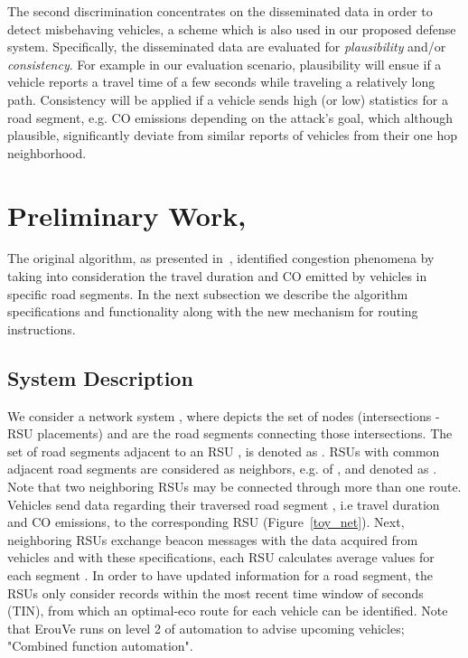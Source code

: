 \documentclass[conference]{IEEEtran}
\begin{document}
The second discrimination concentrates on the disseminated data in order to detect misbehaving vehicles, a scheme which is also used in our proposed defense system. Specifically,
the disseminated data are evaluated for {\it plausibility} and/or {\it consistency}. For example in our evaluation scenario, plausibility will ensue if a vehicle reports
a travel time of a few seconds while traveling a relatively long path. Consistency will be applied if a vehicle sends high (or low) statistics for a road segment, e.g. CO
emissions depending on the attack's goal, which although plausible, significantly deviate from similar reports of
vehicles from their one hop neighborhood.




\section{Preliminary Work, }
\label{erouve-pre}

The original  algorithm, as presented in~\cite{maglaras2013exploiting}, identified congestion phenomena by taking into consideration 
the travel duration and CO emitted by vehicles in specific road segments. In the next subsection we describe the algorithm
specifications and functionality along with the new mechanism for routing instructions.


\subsection{System Description}
We consider a network system , where  depicts the set of nodes (intersections - RSU placements) and  are the road segments connecting those intersections. The set of road segments adjacent to an RSU , is denoted as . RSUs with
common adjacent road segments are considered as neighbors, e.g. of , and denoted as . Note that two neighboring RSUs may be connected through
more than one route. Vehicles send data regarding their traversed road segment , i.e travel duration and CO emissions, to the corresponding RSU (Figure~\ref{toy_net}). Next, 
neighboring RSUs exchange beacon messages with the data acquired from vehicles and with these specifications, each RSU  calculates average values for each segment 
. In order to have updated information for a road segment, the RSUs only consider records within the most recent time window of  seconds (TIN), from which 
an optimal-eco route for each vehicle can be identified.  
Note that ErouVe runs on level 2 of automation to advise upcoming vehicles;  "Combined function automation".
\end{document}
